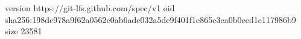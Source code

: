 version https://git-lfs.github.com/spec/v1
oid sha256:198dc978a9f62a0562c0ab6adc032a5dc9f401f1e865c3ca0b0eed1e117986b9
size 23581

